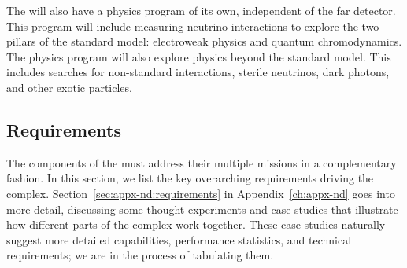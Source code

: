 The  will also have a physics program of its own, independent of the far detector.  This program will include measuring neutrino interactions to explore the two pillars of the standard model: electroweak physics and quantum chromodynamics. The  physics program will also explore physics beyond the standard model. This includes searches for non-standard interactions, sterile neutrinos,  dark photons, and  other exotic particles.

\subsection{Requirements}
\label{sec:exsum-nd-requirements}

The components of the   must address their multiple missions in a complementary fashion. In this section, we list the key overarching requirements driving the  complex. Section~\ref{sec:appx-nd:requirements} in Appendix~\ref{ch:appx-nd} goes into more detail, discussing some thought experiments and case studies that illustrate how different parts of the complex work together. These case studies naturally suggest more detailed capabilities, performance statistics, and technical requirements; we are in the process of tabulating them. 

